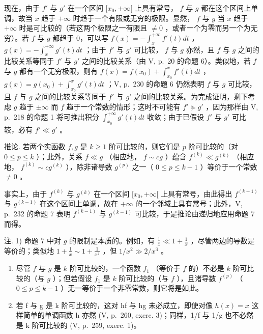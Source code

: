 现在，由于 \(f'\) 与 \(g'\) 在一个区间 \([x_0, +\infty[\) 上具有常号， \(f\) 与 \(g\) 都在这个区间上单调，故当 \(x\) 趋于 \(+\infty\) 时趋于一个有限或无穷的极限。显然， \(f\) 与 \(g\) 当 \(x\) 趋于 \(+\infty\) 时是可比较的（若这两个极限之一有限且 \(\neq 0\) ，或者一个为零而另一个为无穷）。若 \(f\) 与 \(g\) 都趋于 0，可以写 \(f(x) = -\int_x^{+\infty} f'(t) dt\) ， \(g(x) = -\int_x^{+\infty} g'(t) dt\) ；由于 \(f'\) 与 \(g'\) 可比较， \(f\) 与 \(g\) 亦然，且 \(f\) 与 \(g\) 之间的比较关系等同于 \(f'\) 与 \(g'\) 之间的比较关系（由 V, p.~20 的命题 6）。类似地，若 \(f\) 与 \(g\) 都有一个无穷极限，则有 \(f(x) = f(x_0) + \int_{x_0}^x f'(t) dt\) ， \(g(x) = g(x_0) + \int_{x_0}^x g'(t) dt\) ；V, p.~230 的命题 6 仍然表明 \(f\) 与 \(g\) 可比较，且 \(f\) 与 \(g\) 之间的比较关系等同于 \(f'\) 与 \(g'\) 之间的比较关系。为完成证明，剩下考虑 \(g\) 趋于 \(\pm \infty\) 而 \(f\) 趋于一个常数的情形；这时不可能有 \(f' \succcurlyeq g'\) ，因为那样由 V, p.~218 的命题 1 将可推出积分 \(\int_{x_0}^{+\infty} g'(t) dt\) 收敛；由于已假设 \(f'\) 与 \(g'\) 可比较，必有 \(f' \ll g'\) 。

推论. 若两个实函数 \(f, g\) 是 \(k \geqslant 1\) 阶可比较的，则它们是 \(p\) 阶可比较的（对 \(0 \leqslant p \leqslant k\) ）；此外，关系 \(f \ll g\) （相应地， \(f \sim cg\) ）蕴含 \(f^{(k)} \ll g^{(k)}\) （相应地， \(f^{(k)} \sim cg^{(k)}\) ），除非诸导数 \(g^{(p)}\) 之一（ \(0 \leqslant p \leqslant k - 1\) ）等价于一个常数 \(\neq 0\) 。

事实上，由于 \(f^{(k)}\) 与 \(g^{(k)}\) 在一个区间 \([x_0, +\infty[\) 上具有常号，由此得出 \(f^{(k-1)}\) 与 \(g^{(k-1)}\) 在这个区间上单调，故在 \(+\infty\) 的一个邻域上具有常号；此外，V, p.~232 的命题 7 表明 \(f^{(k-1)}\) 与 \(g^{(k-1)}\) 可比较，于是推论由递归地应用命题 7 而得。

注. 1) 命题 7 中对 \(g\) 的限制是本质的。例如，有 \(\frac{1}{x} \ll 1 + \frac{1}{x}\) ，尽管两边的导数是等价的；类似地 \(1 + \frac{1}{x} \sim 1 + \frac{1}{x^2}\) ，但 \(1 / x^2 \gg 2 / x^3\) 。

\begin{enumerate}
\def\labelenumi{\arabic{enumi})}
\setcounter{enumi}{1}
\item
  尽管 \(f\) 与 \(g\) 是 \(k\) 阶可比较的，一个函数 \(f_{1}\) （等价于 \(f\) 的）不必是 \(k\) 阶可比较的（与 \(g\) ）；但若假设 \(f_{1}\) 是 \(k\) 阶可比较的（与 \(f\) ），且诸导数 \(f^{(p)}\) （ \(0 \leqslant p \leqslant k - 1\) ）无一等价于一个非零常数，则它将是如此。
\item
  若 f 与 g 是 k 阶可比较的，这对 hf 与 hg 未必成立，即使对像 \(h(x) = x\) 这样简单的单调函数 h 亦然 (V, p.~260, exerc. 3)；同样，1/f 与 1/g 也不必然是 k 阶可比较的 (V, p.~259, exerc. 1)。
\end{enumerate}

